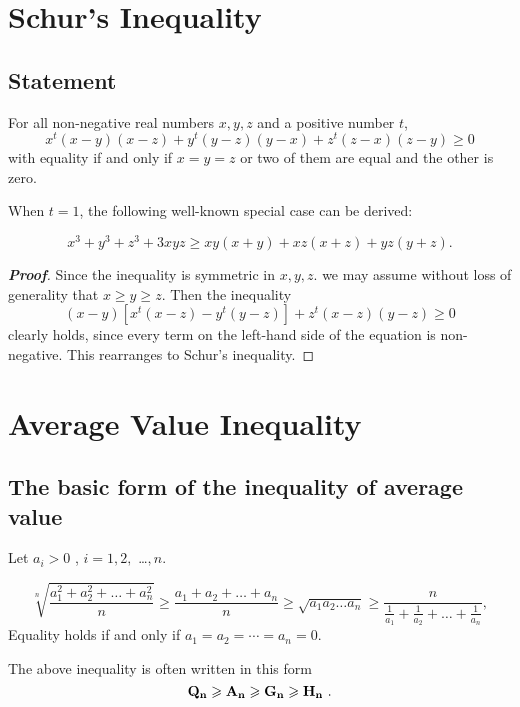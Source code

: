 \documentclass[a4paper]{report}
\begin{document}
\chapter{Schur's Inequality}
\section{Statement}
\begin{thr}
For all non-negative real numbers $x, y, z$ and a positive number $t$,
\begin{equation}
x^{t}(x-y)(x-z)+y^{t}(y-z)(y-x)+z^{t}(z-x)(z-y)\geqslant0
\end{equation}
with equality if and only if $x = y = z$ or two of them are equal and the other is zero.\\ 
\end{thr}

When $t=1$, the following well-known special case can be derived:

\begin{equation}
x^3+y^3+z^3+3xyz\geqslant xy(x+y)+xz(x+z)+yz(y+z).
\end{equation}

\begin{proof}[\bf{Proof}]

Since the inequality is symmetric in $x,y,z$. we may assume without loss of generality that $x\geqslant y\geqslant z$. Then the inequality
\[(x-y)[x^{t}(x-z)-y^{t}(y-z)]+z^{t}(x-z)(y-z)\geqslant 0\]
clearly holds, since every term on the left-hand side of the equation is non-negative. This rearranges to Schur's inequality.
\end{proof}

\chapter{Average Value Inequality}

    \section{The basic form of the inequality of average value}

	\begin{thr}
	
	Let $a_i>0$ , $i=1,2,$ \dots $,n.$
	
		\begin{equation}
		\sqrt[n]{\frac{a_1^2+a_2^2+\dots+a_n^2}{n}}
		\geqslant\frac{a_1+a_2+\dots+a_n}{n}
		 \geqslant\sqrt{a_1a_2\dots a_n}
		\geqslant\frac{n}{\frac{1}{a_1}+\frac{1}{a_2}+\dots +\frac{1}{a_n}},
		\end{equation}
	    Equality holds if and only if
$a_1=a_2=\cdots=a_n=0$.
    
	    The above inequality is often written in this form
	    \[\bf{Q_n}\geqslant
	    \bf{A_n}\geqslant
	    \bf{G_n}\geqslant
	    \bf{H_n}\ .\]
	    \\
	\end{thr}
	\par 
	
\end{document}
